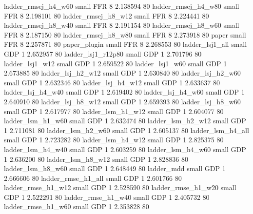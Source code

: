      ladder_rmsej_h4_w60      small      FFR                 8 2.138594 80
     ladder_rmsej_h4_w80      small      FFR                 8 2.198101 80
     ladder_rmsej_h8_w12      small      FFR                 8 2.224441 80
     ladder_rmsej_h8_w40      small      FFR                 8 2.191154 80
     ladder_rmsej_h8_w60      small      FFR                 8 2.187150 80
     ladder_rmsej_h8_w80      small      FFR                 8 2.273918 80
                   paper      small      FFR                 8 2.257871 80
            paper_plugin      small      FFR                 8 2.268553 80
         ladder_lsj1_all      small      GDP                 1 2.652957 80
      ladder_lsj1_r12p80      small      GDP                 1 2.701796 80
         ladder_lsj1_w12      small      GDP                 1 2.659522 80
         ladder_lsj1_w60      small      GDP                 1 2.673885 80
       ladder_lsj_h2_w12      small      GDP                 1 2.630840 80
       ladder_lsj_h2_w60      small      GDP                 1 2.632346 80
       ladder_lsj_h4_w12      small      GDP                 1 2.633637 80
       ladder_lsj_h4_w40      small      GDP                 1 2.619402 80
       ladder_lsj_h4_w60      small      GDP                 1 2.640910 80
       ladder_lsj_h8_w12      small      GDP                 1 2.659393 80
       ladder_lsj_h8_w60      small      GDP                 1 2.617977 80
       ladder_lsm_h1_w12      small      GDP                 1 2.604077 80
       ladder_lsm_h1_w60      small      GDP                 1 2.632474 80
       ladder_lsm_h2_w12      small      GDP                 1 2.711081 80
       ladder_lsm_h2_w60      small      GDP                 1 2.605137 80
       ladder_lsm_h4_all      small      GDP                 1 2.723282 80
       ladder_lsm_h4_w12      small      GDP                 1 2.825375 80
       ladder_lsm_h4_w40      small      GDP                 1 2.603259 80
       ladder_lsm_h4_w60      small      GDP                 1 2.636200 80
       ladder_lsm_h8_w12      small      GDP                 1 2.828836 80
       ladder_lsm_h8_w60      small      GDP                 1 2.648449 80
              ladder_mdd      small      GDP                 1 2.666606 80
      ladder_rmse_h1_all      small      GDP                 1 2.601766 80
      ladder_rmse_h1_w12      small      GDP                 1 2.528590 80
      ladder_rmse_h1_w20      small      GDP                 1 2.522291 80
      ladder_rmse_h1_w40      small      GDP                 1 2.405732 80
      ladder_rmse_h1_w60      small      GDP                 1 2.353828 80
